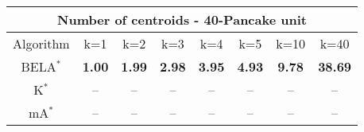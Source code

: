\begin{tabular}{c|ccccccc}\toprule
\multicolumn{8}{c}{Number of centroids - 40-Pancake unit}\\ \midrule
Algorithm & k=1 & k=2 & k=3 & k=4 & k=5 & k=10 & k=40 \\ \midrule
BELA$^*$ & \textbf{1.00} & \textbf{1.99} & \textbf{2.98} & \textbf{3.95} & \textbf{4.93} & \textbf{9.78} & \textbf{38.69} \\
K$^*$ & -- & -- & -- & -- & -- & -- & -- \\
mA$^*$ & -- & -- & -- & -- & -- & -- & -- \\ \bottomrule 
\end{tabular}
